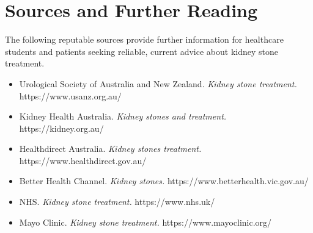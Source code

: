 \section*{Sources and Further Reading}
The following reputable sources provide further information for healthcare students and patients seeking reliable, current advice about kidney stone treatment.
\begin{itemize}
    \item Urological Society of Australia and New Zealand. \textit{Kidney stone treatment.} https://www.usanz.org.au/
    \item Kidney Health Australia. \textit{Kidney stones and treatment.} https://kidney.org.au/
    \item Healthdirect Australia. \textit{Kidney stones treatment.} https://www.healthdirect.gov.au/
    \item Better Health Channel. \textit{Kidney stones.} https://www.betterhealth.vic.gov.au/
    \item NHS. \textit{Kidney stone treatment.} https://www.nhs.uk/
    \item Mayo Clinic. \textit{Kidney stone treatment.} https://www.mayoclinic.org/
\end{itemize}
